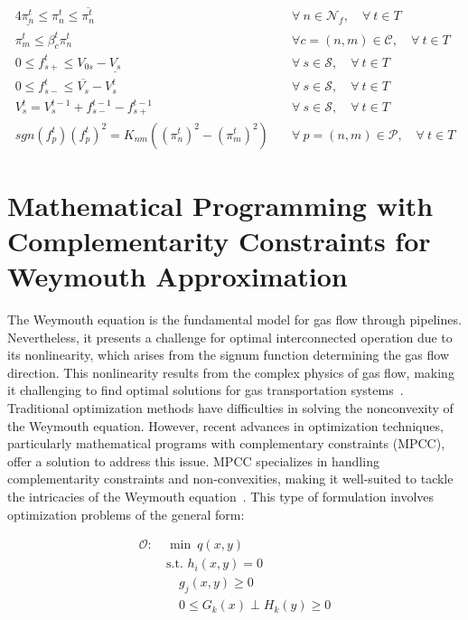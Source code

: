 \begin{alignat}{4}
    \underline{\pi_{n}^t} \leq \pi_{n}^t \leq \overline{\pi_{n}^t} &\quad \forall \ n \in \mathcal{N}_f, \quad \forall \ t \in T \label{eq:press_limit} \\
    \pi_{m}^t \leq \beta_{c}^t{\pi_{n}^t} &\quad \forall c=(n,m) \in \mathcal{C}, \quad \forall \ t \in T \label{eq:comp_ratio} \\
    0 \leq f_{s+}^t \leq V_{0s} - \underline{V_s} &\quad \forall \ s \in \mathcal{S} , \quad \forall \ t \in T \label{eq:sto_limit1} \\ 
    0 \leq f_{s-}^t \leq \overline{V_s} - V_{s}^t &\quad \forall \ s \in \mathcal{S}, \quad \forall \ t \in T \label{eq:sto_limit2} \\ 
    V_{s}^t = V_{s}^{t-1} + f_{s-}^{t-1} - f_{s+}^{t-1} &\quad \forall \ s \in \mathcal{S}, \quad \forall \ t \in T \label{eq:sto_time}\\
    sgn(f_{p}^t)(f_{p}^t)^2 = K_{nm}((\pi_{n}^t)^2-(\pi_{m}^t)^2) &\quad \forall \ p =(n,m) \in\mathcal{P}, \quad \forall \ t \in T \label{eq:weymouth_constraint}
\end{alignat}


\section{Mathematical Programming with Complementarity Constraints for Weymouth Approximation} \label{sec:mpcc}

The Weymouth equation is the fundamental model for gas flow through pipelines. Nevertheless, it presents a challenge for optimal interconnected operation due to its nonlinearity, which arises from the signum function determining the gas flow direction. This nonlinearity results from the complex physics of gas flow, making it challenging to find optimal solutions for gas transportation systems~\citep{weymouth_nonconvex}. Traditional optimization methods have difficulties in solving the nonconvexity of the Weymouth equation. However, recent advances in optimization techniques, particularly mathematical programs with complementary constraints (MPCC), offer a solution to address this issue. MPCC specializes in handling complementarity constraints and non-convexities, making it well-suited to tackle the intricacies of the Weymouth equation~\citep{baumrucker_renfro_biegler_2008}. This type of formulation involves optimization problems of the general form:


\begin{subequations}
\begin{alignat}{4}
\mathcal{O}: \ &\min \ q(x, y) \\
&\text{s.t. } h_i(x, y) = 0 \\
&\quad g_j(x, y) \geq 0 \\
&\quad 0 \leq G_k(x) \perp H_k(y) \geq 0 \label{eq:complementarity}
\end{alignat}
\end{subequations}



